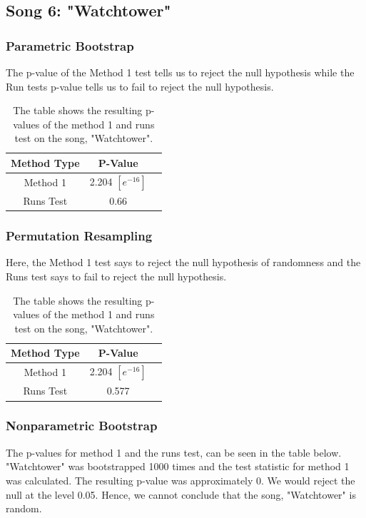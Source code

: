 \documentclass[12pt, letterpaper]{article}
\begin{document}
\subsection{Song 6: "Watchtower"}
\subsubsection{Parametric Bootstrap}
The p-value of the Method 1 test tells us to reject the null hypothesis while the Run tests p-value tells us to fail to reject the null hypothesis.
\begin{table}[h]
\begin{center}
\begin{tabular}{|c|c|c|}
\hline
\textbf{Method Type} & P-Value  \\
\hline
Method 1 & 2.204 $[e^{-16}]$ \\
\hline
Runs Test & 0.66 \\ 
\hline
\end{tabular}
\end{center}
\caption{The table shows the resulting p-values of the method 1 and runs test on the song, "Watchtower".}
\label{fig: P-values for "Watchtower": Parametric Bootstrap}
\end{table}

\subsubsection{Permutation Resampling}
Here, the Method 1 test says to reject the null hypothesis of randomness and the Runs test says to fail to reject the null hypothesis.
\begin{table}[h]
\begin{center}
\begin{tabular}{|c|c|c|}
\hline
\textbf{Method Type} & P-Value  \\
\hline
Method 1 & 2.204 $[e^{-16}]$ \\
\hline
Runs Test & 0.577 \\ 
\hline
\end{tabular}
\end{center}
\caption{The table shows the resulting p-values of the method 1 and runs test on the song, "Watchtower".}
\label{fig: P-values for "Watchtower": Permutation Resampling}
\end{table}

\subsubsection{Nonparametric Bootstrap}
The p-values for method 1 and the runs test, can be seen in the table below. "Watchtower" was bootstrapped 1000 times and the test statistic for method 1 was calculated. The resulting p-value was approximately 0. We would reject the null at the level 0.05. Hence, we cannot conclude that the song, "Watchtower" is random. 
\end{document}
